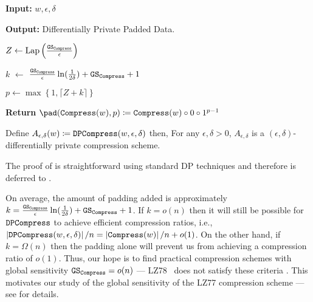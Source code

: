 \begin{algorithm}[ht!]
\caption{$\dpcompress(w, \epsilon, \delta)$}
\begin{algorithmic}%

    
    \State \textbf{Input:} $w,\epsilon,\delta$

    \State \textbf{Output:} Differentially Private Padded Data.
    
    
    \State $Z \gets \mathrm{Lap}\left(\frac{\mathtt{GS}_{\mathtt{Compress}}}{\epsilon}\right)$ 
    
    
    \State $k$ $\gets$ $\frac{\mathtt{GS}_{\mathtt{Compress}}}{\epsilon}\ln(\frac{1}{2\delta})+\mathtt{GS}_{\mathtt{Compress}} +1$ 
    
    \State $p \gets \max\left\{1, \lceil Z+k\rceil \right\}$ 
    
    
    \State \textbf{Return} $\pad(\compress(w), p) \coloneqq \compress(w)\circ0\circ1^{p-1}$
\end{algorithmic}
\end{algorithm}

\newcommand{\dptheorem}{Define $A_{\epsilon,\delta}(w) \coloneqq \dpcompress(w,\epsilon,\delta)$ then, For any $\epsilon, \delta >0$, $A_{\epsilon,\delta}$ is a  $(\epsilon,\delta)$-differentially private compression scheme. %
}

\begin{theorem}
    \dptheorem
\end{theorem}

The proof of  is straightforward using standard DP techniques and therefore is deferred to .

On average, the amount of padding added is approximately $k=\frac{\mathtt{GS}_{\mathtt{Compress}}}{\epsilon}\ln(\frac{1}{2\delta})+\mathtt{GS}_{\mathtt{Compress}} +1$. If $k  = o(n)$ then it will still be possible for $\mathtt{DPCompress}$ to achieve efficient compression ratios, i.e., $\left| \mathtt{DPCompress}(w,\epsilon,\delta) \right|/ n = \left| \mathtt{Compress}(w) \right|/ n + o(1)$. On the other hand, if $k = \Omega(n)$ then the padding alone will prevent us from achieving a compression ratio of $o(1)$. Thus, our hope is to find practical compression schemes with global sensitivity $\mathtt{GS}_{\mathtt{Compress}} = o(n)$ --- LZ78~\cite{LZ78} does not satisfy these criteria \cite{lagarde2018lempel}. This motivates our study of the global sensitivity of the LZ77 compression scheme \cite{LZ77} --- see  for details.



